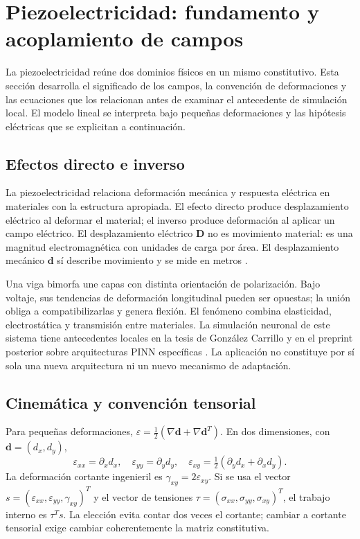 \section{Piezoelectricidad: fundamento y acoplamiento de campos}
La piezoelectricidad reúne dos dominios físicos en un mismo constitutivo. Esta sección desarrolla el significado de los campos, la convención de deformaciones y las ecuaciones que los relacionan antes de examinar el antecedente de simulación local. El modelo lineal se interpreta bajo pequeñas deformaciones y las hipótesis eléctricas que se explicitan a continuación.
\subsection{Efectos directo e inverso}
La piezoelectricidad relaciona deformación mecánica y respuesta eléctrica en materiales con la estructura apropiada. El efecto directo produce desplazamiento eléctrico al deformar el material; el inverso produce deformación al aplicar un campo eléctrico. El desplazamiento eléctrico $\mathbf D$ no es movimiento material: es una magnitud electromagnética con unidades de carga por área. El desplazamiento mecánico $\mathbf d$ sí describe movimiento y se mide en metros \cite{nye2012crystals,lahmer2008}.

Una viga bimorfa une capas con distinta orientación de polarización. Bajo voltaje, sus tendencias de deformación longitudinal pueden ser opuestas; la unión obliga a compatibilizarlas y genera flexión. El fenómeno combina elasticidad, electrostática y transmisión entre materiales. La simulación neuronal de este sistema tiene antecedentes locales en la tesis de González Carrillo y en el preprint posterior sobre arquitecturas PINN específicas \cite{gonzalez2024tesis,gonzalez2026pinnpiezo}. La aplicación no constituye por sí sola una nueva arquitectura ni un nuevo mecanismo de adaptación.

\subsection{Cinemática y convención tensorial}
Para pequeñas deformaciones, $\varepsilon=\tfrac12(\nabla\mathbf d+\nabla\mathbf d^T)$. En dos dimensiones, con $\mathbf d=(d_x,d_y)$,
\begin{equation}
\varepsilon_{xx}=\partial_xd_x,\quad
\varepsilon_{yy}=\partial_yd_y,\quad
\varepsilon_{xy}=\tfrac12(\partial_yd_x+\partial_xd_y).
\end{equation}
La deformación cortante ingenieril es $\gamma_{xy}=2\varepsilon_{xy}$. Si se usa el vector $s=(\varepsilon_{xx},\varepsilon_{yy},\gamma_{xy})^T$ y el vector de tensiones $\tau=(\sigma_{xx},\sigma_{yy},\sigma_{xy})^T$, el trabajo interno es $\tau^Ts$. La elección evita contar dos veces el cortante; cambiar a cortante tensorial exige cambiar coherentemente la matriz constitutiva.

